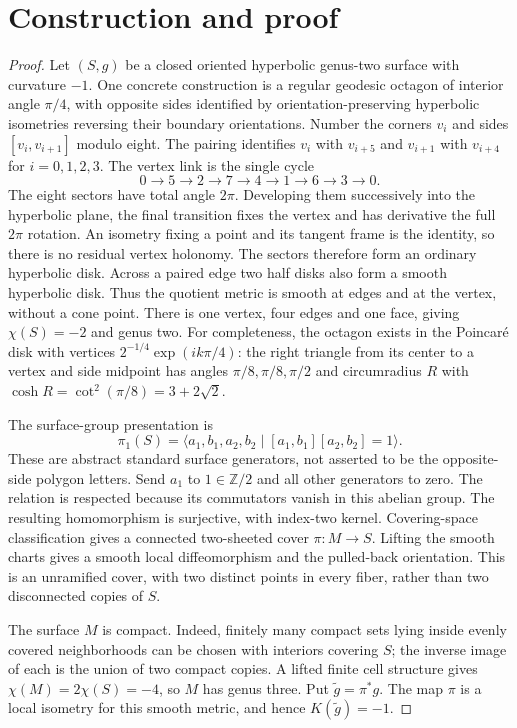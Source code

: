 \documentclass[11pt]{article}
\begin{document}
\section{Construction and proof}
\begin{proof}
Let $(S,g)$ be a closed oriented hyperbolic genus-two surface with curvature
$-1$. One concrete construction is a regular geodesic octagon of interior
angle $\pi/4$, with opposite sides identified by orientation-preserving
hyperbolic isometries reversing their boundary orientations. Number the corners
$v_i$ and sides $[v_i,v_{i+1}]$ modulo eight. The pairing identifies
$v_i$ with $v_{i+5}$ and $v_{i+1}$ with $v_{i+4}$ for $i=0,1,2,3$.
The vertex link is the single cycle
\[
 0\longrightarrow5\longrightarrow2\longrightarrow7\longrightarrow4
 \longrightarrow1\longrightarrow6\longrightarrow3\longrightarrow0.
\]
The eight sectors have total angle $2\pi$. Developing them successively
into the hyperbolic plane, the final transition fixes the vertex and has
derivative the full $2\pi$ rotation. An isometry fixing a point and its tangent
frame is the identity, so there is no residual vertex holonomy. The sectors
therefore form an ordinary hyperbolic disk. Across a paired edge two half disks
also form a smooth hyperbolic disk.
Thus the quotient metric is smooth at edges and at the vertex, without a cone
point. There is one vertex, four edges and one face, giving $\chi(S)=-2$ and
genus two. For completeness, the octagon exists in the Poincar\'e disk with
vertices $2^{-1/4}\exp(ik\pi/4)$: the right triangle from its center to a vertex
and side midpoint has angles $\pi/8,\pi/8,\pi/2$ and circumradius $R$ with
$\cosh R=\cot^2(\pi/8)=3+2\sqrt2$.

The surface-group presentation is
\[
 \pi_1(S)=\langle a_1,b_1,a_2,b_2\mid[a_1,b_1][a_2,b_2]=1\rangle.
\]
These are abstract standard surface generators, not asserted to be the
opposite-side polygon letters. Send $a_1$ to $1\in\mathbb Z/2$ and all other
generators to zero. The relation is respected because its commutators vanish
in this abelian group. The resulting homomorphism is surjective, with
index-two kernel. Covering-space classification \cite[Prop.~1.32,
Prop.~1.36 and Thm.~1.38]{hatcher} gives a connected two-sheeted cover
$\pi:M\to S$. Lifting the smooth charts gives a smooth local diffeomorphism
and the pulled-back orientation. This is an unramified cover, with two
distinct points in every fiber, rather than two disconnected copies of $S$.

The surface $M$ is compact. Indeed, finitely many compact sets lying inside
evenly covered neighborhoods can be chosen with interiors covering $S$;
the inverse image of each is the union of two compact copies. A lifted finite
cell structure gives $\chi(M)=2\chi(S)=-4$, so $M$ has genus three. Put
$\widetilde g=\pi^*g$. The map $\pi$ is a local isometry for this smooth metric,
and hence $K(\widetilde g)=-1$.


\end{proof}
\end{document}
